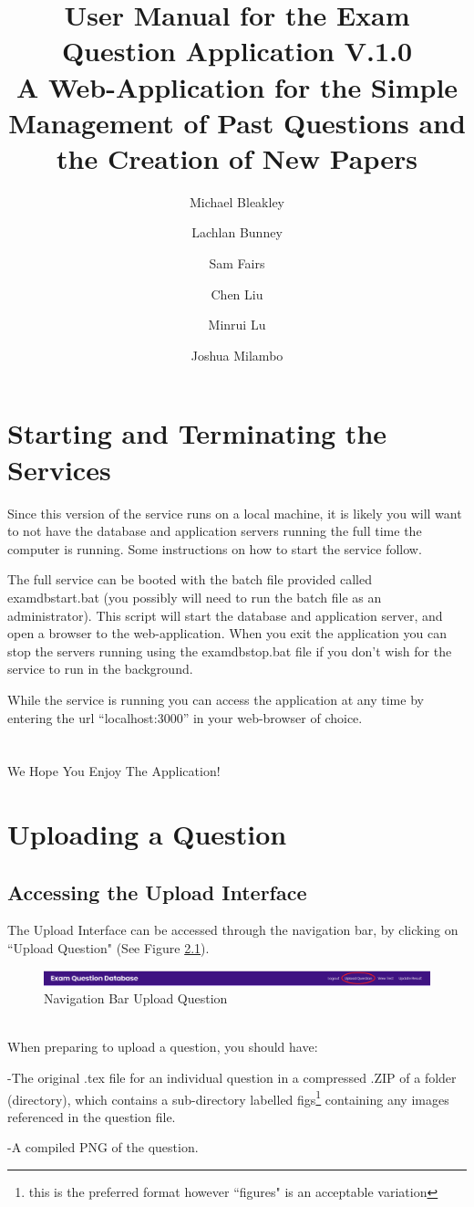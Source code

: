 \documentclass[12pt, a4paper, titlepage]{book}
\author{
    Michael Bleakley
  \and
    Lachlan Bunney
    \and
    Sam Fairs
    \and
    Chen Liu
	\and
	Minrui Lu
	\and
	Joshua Milambo
}
\begin{document}
\begin{titlepage}

\title{User Manual for the Exam Question Application V.1.0\\ \normalsize A Web-Application for the Simple Management of Past Questions and the Creation of New Papers}
\maketitle
\end{titlepage}
\tableofcontents
\frontmatter
\small
\chapter{Starting and Terminating the Services}
Since this version of the service runs on a local machine, it is likely you will want to not have the database and application servers running the full time the computer is running. Some instructions on how to start the service follow.

The full service can be booted with the batch file provided called examdbstart.bat (you possibly will need to run the batch file as an administrator). This script will start the database and application server, and open a browser to the web-application. When you exit the application you can stop the servers running using the examdbstop.bat file if you don't wish for the service to run in the background. 

While the service is running you can access the application at any time by entering the url ``localhost:3000'' in your web-browser of choice.
\\\\\\
\large We Hope You Enjoy The Application!

\normalsize
\mainmatter
\chapter{Uploading a Question}
\section{Accessing the Upload Interface}
The Upload Interface can be accessed through the navigation bar, by clicking on ``Upload Question" (See Figure \ref{fig:upQ}).
\begin{figure}[htp]
\centering
\includegraphics[width =16cm]{NavBarUpQ.PNG}
\caption{Navigation Bar Upload Question}
\label{fig:upQ}
\end{figure}
\\
When preparing to upload a question, you should have:\par -The original .tex file for an individual question in a compressed .ZIP of a folder (directory), which contains a sub-directory labelled figs\footnote{this is the preferred format however ``figures" is an acceptable variation} containing any images referenced in the question file. \par -A compiled PNG of the question.
\end{document}
